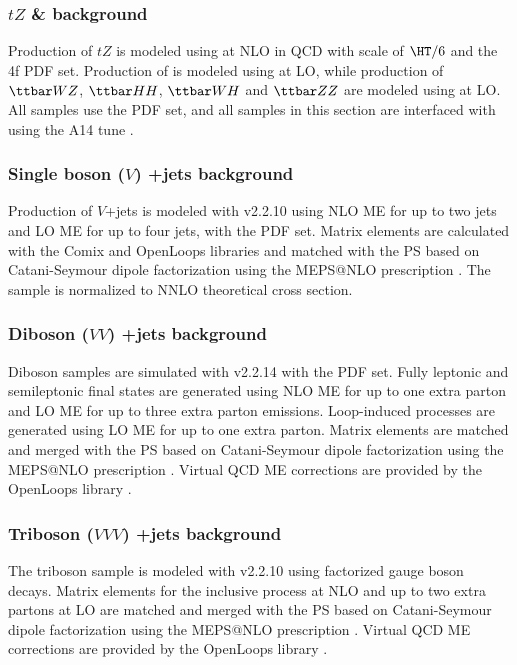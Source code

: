 \documentclass[../thesis.tex]{subfiles}
\begin{document}
\subsubsection*{$tZ$ \& \ttVV background}
Production of $tZ$ is modeled using \mgamc \citep{Alwall:2014hca} at \acs{NLO} in \acs{QCD} with scale of $\HT/6$ and the \nnpdfnlo 4f \citep{Ball:2014uwa} \acs{PDF} set. Production of \ttWW is modeled using \mgamc \citep{Alwall:2014hca} at \acs{LO}, while production of $\ttbar WZ$, $\ttbar HH$, $\ttbar WH$ and $\ttbar ZZ$ are modeled using \mg at \acs{LO}. All \ttVV samples use the \nnpdfnlo \citep{Ball:2014uwa} \acs{PDF} set, and all samples in this section are interfaced with \pythia \citep{Sjostrand:2014zea} using the A14 tune \citep{ATL-PHYS-PUB-2014-021}.
\subsubsection*{Single boson ($V$) +jets background}
Production of $V$+jets is modeled with \sherpa v2.2.10 \citep{Bothmann:2019yzt} using \acs{NLO} \acs{ME} for up to two jets and \acs{LO} \acs{ME} for up to four jets, with the \nnpdfnlo \citep{Ball:2014uwa} \acs{PDF} set. Matrix elements are calculated with the Comix \citep{Gleisberg:2008fv} and OpenLoops libraries \citep{Cascioli:2011va, Denner:2016kdg} and matched with the \sherpa \acs{PS} based on Catani-Seymour dipole factorization \citep{Schumann:2007mg} using the MEPS@NLO prescription \citep{Hoeche:2011fd, Hoeche:2012yf, Catani:2001cc, Hoeche:2009rj}. The sample is normalized to \acs{NNLO} \citep{Anastasiou:2003ds} theoretical cross section.
\subsubsection*{Diboson ($VV$) +jets background}
Diboson samples are simulated with \sherpa v2.2.14 \citep{Bothmann:2019yzt} with the \nnpdfnlo \citep{Ball:2014uwa} \acs{PDF} set. Fully leptonic and semileptonic final states are generated using \acs{NLO} \acs{ME} for up to one extra parton and  \acs{LO} \acs{ME} for up to three extra parton emissions. Loop-induced processes are generated using \acs{LO} \acs{ME} for up to one extra parton. Matrix elements are matched and merged with the \sherpa \acs{PS} based on Catani-Seymour dipole factorization \citep{Schumann:2007mg} using the MEPS@NLO prescription \citep{Hoeche:2011fd, Hoeche:2012yf, Catani:2001cc, Hoeche:2009rj}. Virtual \acs{QCD} \acs{ME} corrections are provided by the OpenLoops library \citep{Cascioli:2011va, Denner:2016kdg}.
\subsubsection*{Triboson ($VVV$) +jets background}
The triboson sample is modeled with \sherpa v2.2.10 \citep{Bothmann:2019yzt} using factorized gauge boson decays. Matrix elements for the inclusive process at \acs{NLO} and up to two extra partons at \acs{LO} are matched and merged with the \sherpa \acs{PS} based on Catani-Seymour dipole factorization \citep{Schumann:2007mg} using the MEPS@NLO prescription \citep{Hoeche:2011fd, Hoeche:2012yf, Catani:2001cc, Hoeche:2009rj}. Virtual \acs{QCD} \acs{ME} corrections are provided by the OpenLoops library \citep{Cascioli:2011va, Denner:2016kdg}.
\end{document}

